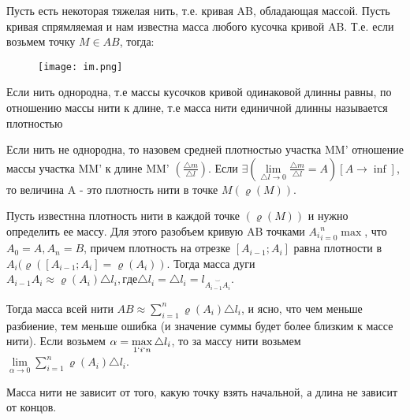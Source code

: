 Пусть есть некоторая тяжелая нить, т.е. кривая AB, обладающая массой.
Пусть кривая спрямляемая и нам известна масса любого кусочка кривой AB.
Т.е. если возьмем точку $M \in AB$, тогда:

\begin{wrapfigure}{r}[5pt]{0.4\textwidth}
\centering \texttt{[image: im.png]}
\end{wrapfigure}

Если нить однородна, т.е массы кусочков кривой одинаковой длинны равны,
по отношению массы нити к длине, т.е масса нити единичной длинны называется плотностью

Если нить не однородна, то назовем средней плотностью участка MM' отношение массы участка MM' к
длине MM' $(\frac{\triangle m}{\triangle l})$.
Если $\exists(\lim\limits_{\triangle l \rightarrow 0}\frac{\triangle m}{\triangle l} = A)[A \rightarrow \inf]$, то величина A - это плотность нити в точке $M (\varrho (M) )$.

Пусть известнна плотность нити в каждой точке $(\varrho (M) )$ и нужно определить ее массу.
Для этого разобъем кривую AB точками ${A_i}_{i=0}^{n}\max$,
что $A_0 = A, A_n = B$, причем плотность на отрезке $[A_{i-1}; A_i]$ равна плотности
в $A_i(\varrho ([A_{i-1}; A_i] = \varrho (A_i))$.
Тогда масса дуги $A_{i-1}A_i \approx \varrho (A_i)\triangle l_i ,
где \triangle l_i = \triangle l_i = l_{\overset {\smile} {A_{i-1}{A_i}}}$.

Тогда масса всей нити $AB \approx \sum_{i=1}^{n} \varrho (A_i)\triangle l_i$, и ясно,
что чем меньше разбиение, тем меньше ошибка (и значение суммы будет более близким к массе нити).
Если возьмем $\alpha = \max\limits_{1 \lq i \lq n}\triangle l_i$, то за массу нити возьмем $\lim\limits_{\alpha \rightarrow 0} \sum_{i=1}^{n} \varrho (A_i)\triangle l_i$.

Масса нити не зависит от того, какую точку взять начальной, а длина не зависит от концов.



